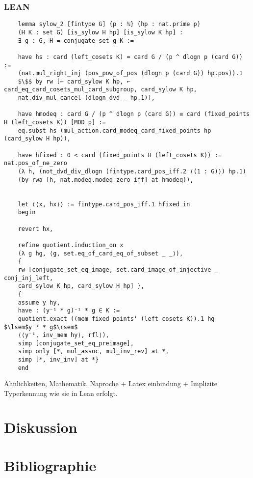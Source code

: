 \documentclass[a4paper,12pt]{scrartcl}
\begin{document}
\subsubsection{LEAN}
\lstset{language=lean}
\begin{lstlisting}
	lemma sylow_2 [fintype G] {p : ℕ} (hp : nat.prime p)
	(H K : set G) [is_sylow H hp] [is_sylow K hp] :
	∃ g : G, H = conjugate_set g K :=
	
	have hs : card (left_cosets K) = card G / (p ^ dlogn p (card G)) := 
	(nat.mul_right_inj (pos_pow_of_pos (dlogn p (card G)) hp.pos)).1
	$\$$ by rw [← card_sylow K hp, ← card_eq_card_cosets_mul_card_subgroup, card_sylow K hp, 
	nat.div_mul_cancel (dlogn_dvd _ hp.1)],
	
	have hmodeq : card G / (p ^ dlogn p (card G)) ≡ card (fixed_points H (left_cosets K)) [MOD p] := 
	eq.subst hs (mul_action.card_modeq_card_fixed_points hp (card_sylow H hp)),
	
	have hfixed : 0 < card (fixed_points H (left_cosets K)) := nat.pos_of_ne_zero 
	(λ h, (not_dvd_div_dlogn (fintype.card_pos_iff.2 ⟨(1 : G)⟩) hp.1) 
	(by rwa [h, nat.modeq.modeq_zero_iff] at hmodeq)),

	
	let ⟨⟨x, hx⟩⟩ := fintype.card_pos_iff.1 hfixed in
	begin
	
	revert hx,
	
	refine quotient.induction_on x
	(λ g hg, ⟨g, set.eq_of_card_eq_of_subset _ _⟩),
	{ 
	rw [conjugate_set_eq_image, set.card_image_of_injective _ conj_inj_left,
	card_sylow K hp, card_sylow H hp] },
	{
	assume y hy,
	have : (y⁻¹ * g)⁻¹ * g ∈ K := 
	quotient.exact ((mem_fixed_points' (left_cosets K)).1 hg $\lsem$y⁻¹ * g$\rsem$ 
	⟨⟨y⁻¹, inv_mem hy⟩, rfl⟩),
	simp [conjugate_set_eq_preimage], 
	simp only [*, mul_assoc, mul_inv_rev] at *,
	simp [*, inv_inv] at *}
	end
\end{lstlisting}

Ähnlichkeiten, Mathematik, Naproche + Latex einbindung + Implizite Typerkennung wie sie in Lean erfolgt.



\section{Diskussion}

\section{Bibliographie}
\end{document}
